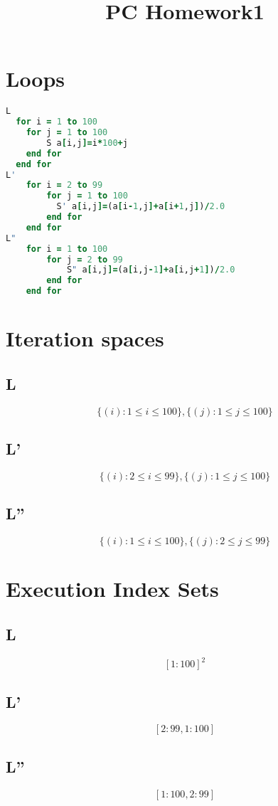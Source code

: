 \documentclass[]{article}
\title{PC Homework1}
\author{}
\begin{document}
\maketitle

\section{Loops}

\begin{lstlisting}[language=Fortran,tabsize=4]
L 
  for i = 1 to 100
  	for j = 1 to 100
        S a[i,j]=i*100+j
    end for
  end for
L' 
    for i = 2 to 99
		for j = 1 to 100
		  S' a[i,j]=(a[i-1,j]+a[i+1,j])/2.0
		end for
	end for
L" 
	for i = 1 to 100
		for j = 2 to 99
			S" a[i,j]=(a[i,j-1]+a[i,j+1])/2.0
		end for
	end for
\end{lstlisting}


\section{Iteration spaces}

\subsection{L}
$$\{ (i) : 1 \leq i \leq 100\}, \{ (j) : 1 \leq j \leq 100\} $$
\subsection{L'}
$$\{ (i) : 2 \leq i \leq 99\}, \{ (j) : 1 \leq j \leq 100\} $$
\subsection{L''}
$$\{ (i) : 1 \leq i \leq 100\}, \{ (j) : 2 \leq j \leq 99\} $$

\section{Execution Index Sets}

\subsection{L}
$${[1:100]}^2$$
\subsection{L'}
$${[2:99,1:100]}$$
\subsection{L''}
$${[1:100,2:99]}$$
\end{document}
